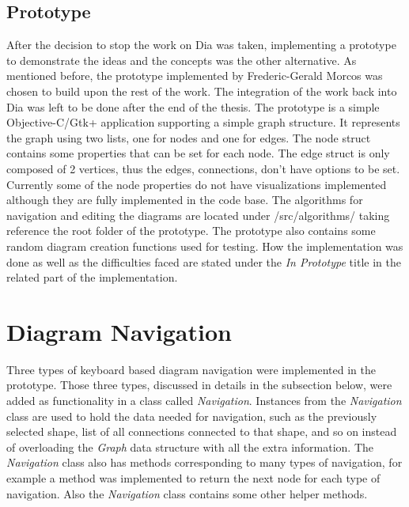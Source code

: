 \subsection{Prototype}
After the decision to stop the work on Dia was taken, implementing a prototype to demonstrate the ideas and the concepts was the other alternative. As mentioned before, the prototype implemented by Frederic-Gerald Morcos was chosen to build upon the rest of the work. The integration of the work back into Dia was left to be done after the end of the thesis. The prototype is a simple Objective-C/Gtk+ application supporting a simple graph structure. It represents the graph using two lists, one for nodes and one for edges. The node struct contains some properties that can be set for each node. The edge struct is only composed of 2 vertices, thus the edges, connections, don't have options to be set. Currently some of the node properties do not have visualizations implemented although they are fully implemented in the code base. The algorithms for navigation and editing the diagrams are located under /src/algorithms/ taking reference the root folder of the prototype. The prototype also contains some random diagram creation functions used for testing.  How the implementation was done as well as the difficulties faced are stated under the {\it In Prototype} title in the related part of the implementation.


\section{Diagram Navigation}
Three types of keyboard based diagram navigation were implemented in the prototype. Those three types, discussed in details in the subsection below, were added as functionality in a class called {\it Navigation}. Instances from the {\it Navigation} class are used to hold the data needed for navigation, such as the previously selected shape, list of all connections connected to that shape, and so on instead of overloading the {\it Graph} data structure with all the extra information. The {\it Navigation} class also has methods corresponding to many types of navigation, for example a method was implemented to return the next node for each type of navigation. Also the {\it Navigation} class contains some other helper methods.

